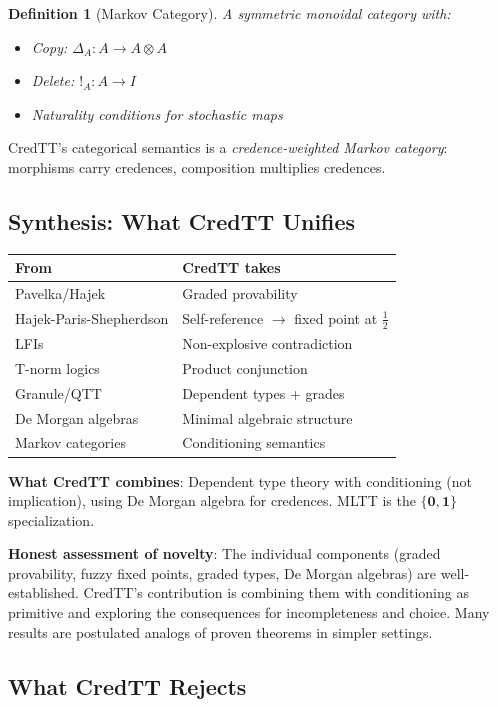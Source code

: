 \documentclass[11pt,a4paper]{article}
\newtheorem{definition}{Definition}[section]
\newcommand{\one}{\mathbf{1}}
\newcommand{\zero}{\mathbf{0}}
\begin{document}
\begin{definition}[Markov Category]
A symmetric monoidal category with:
\begin{itemize}
    \item Copy: $\Delta_A : A \to A \otimes A$
    \item Delete: $!_A : A \to I$
    \item Naturality conditions for stochastic maps
\end{itemize}
\end{definition}

CredTT's categorical semantics is a \emph{credence-weighted Markov category}: morphisms carry credences, composition multiplies credences.

\subsection{Synthesis: What CredTT Unifies}

\begin{center}
\begin{tabular}{l|l}
\textbf{From} & \textbf{CredTT takes} \\
\hline
Pavelka/Hajek & Graded provability \\
Hajek-Paris-Shepherdson & Self-reference $\to$ fixed point at $\frac{1}{2}$ \\
LFIs & Non-explosive contradiction \\
T-norm logics & Product conjunction \\
Granule/QTT & Dependent types + grades \\
De Morgan algebras & Minimal algebraic structure \\
Markov categories & Conditioning semantics \\
\end{tabular}
\end{center}

\textbf{What CredTT combines}: Dependent type theory with conditioning (not implication), using De Morgan algebra for credences. MLTT is the $\{\zero,\one\}$ specialization.

\textbf{Honest assessment of novelty}: The individual components (graded provability, fuzzy fixed points, graded types, De Morgan algebras) are well-established. CredTT's contribution is combining them with conditioning as primitive and exploring the consequences for incompleteness and choice. Many results are postulated analogs of proven theorems in simpler settings.

\subsection{What CredTT Rejects}
\end{document}
